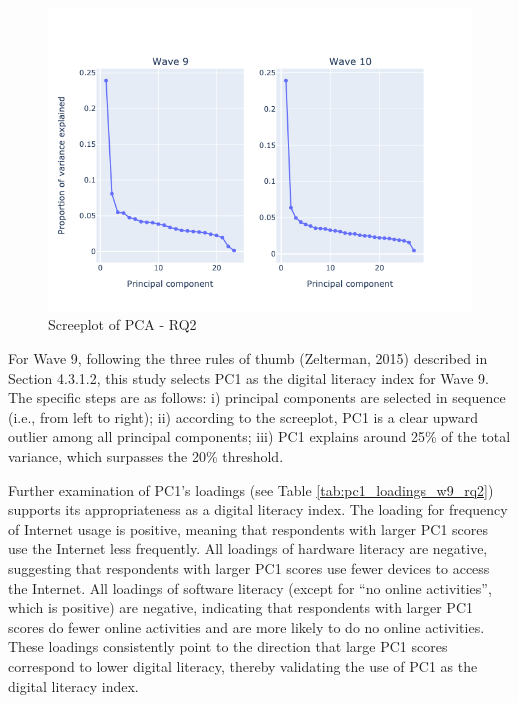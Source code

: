 \begin{figure}
    \centering
    \caption{Screeplot of PCA - RQ2}
    \label{fig:screeplot_rq2}
    \includegraphics[width=\textwidth]{figures/pca_screeplot_q2.png}
\end{figure}

For Wave 9, following the three rules of thumb (Zelterman, 2015) described in Section 4.3.1.2, this study selects PC1 as the digital literacy index for Wave 9. The specific steps are as follows: i) principal components are selected in sequence (i.e., from left to right); ii) according to the screeplot, PC1 is a clear upward outlier among all principal components; iii) PC1 explains around 25\% of the total variance, which surpasses the 20\% threshold. 

Further examination of PC1's loadings (see Table \ref{tab:pc1_loadings_w9_rq2}) supports its appropriateness as a digital literacy index. The loading for frequency of Internet usage is positive, meaning that respondents with larger PC1 scores use the Internet less frequently. All loadings of hardware literacy are negative, suggesting that respondents with larger PC1 scores use fewer devices to access the Internet. All loadings of software literacy (except for “no online activities”, which is positive) are negative, indicating that respondents with larger PC1 scores do fewer online activities and are more likely to do no online activities. These loadings consistently point to the direction that large PC1 scores correspond to lower digital literacy, thereby validating the use of PC1 as the digital literacy index.


